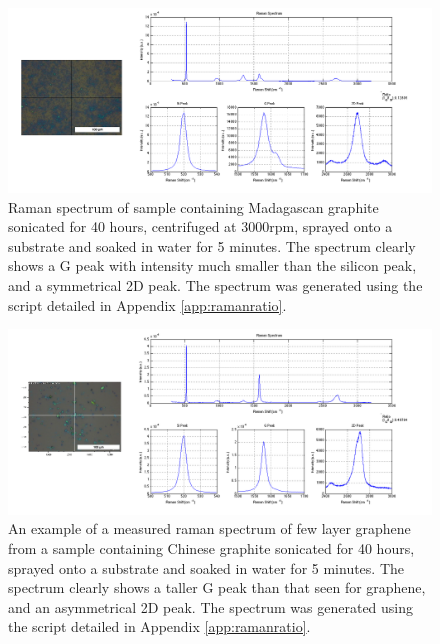 \documentclass[12pt,titlepage]{article}
\begin{document}
	\begin{figure}
		\centering
		\includegraphics[width=1\textwidth]{figures/best.png}
		\caption[Clearest raman spectrum found for graphene.]{Raman spectrum of sample containing Madagascan graphite sonicated for 40 hours, centrifuged at 3000rpm, sprayed onto a substrate and soaked in water for 5 minutes. The spectrum clearly shows a G peak with intensity much smaller than the silicon peak, and a symmetrical 2D peak. The spectrum was generated using the script detailed in Appendix \ref{app:ramanratio}.}
		\label{fig:mad-sample}
	\end{figure}
	
	\begin{figure}
		\centering
		\includegraphics[width=1\textwidth]{figures/best-few-layer.png}
		\caption[Clearest raman spectrum found for few layer graphene.]{An example of a measured raman spectrum of few layer graphene from a sample containing Chinese graphite sonicated for 40 hours, sprayed onto a substrate and soaked in water for 5 minutes. The spectrum clearly shows a taller G peak than that seen for graphene, and an asymmetrical 2D peak. The spectrum was generated using the script detailed in Appendix \ref{app:ramanratio}.}
		\label{fig:best-few-layer}
	\end{figure}
	
\end{document}
